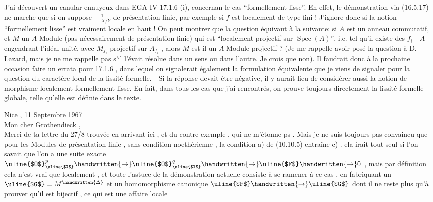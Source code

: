 
J'ai découvert un canular ennuyeux dans EGA IV 17.1.6 (i), concernan le cas ``formellement lisse''. En effet, le démonstration via (16.5.17) ne marche que si on suppose $\quad{}^1_{X/Y}$ de présentation finie, par exemple si $f$ est localement de  type fini ! J'ignore donc si la notion ``formellement lisse'' est vraiment locale en haut ! On peut montrer que la question équivaut à la suivante: si $A$ est un anneau commutatif, et $M$ un $A$-Module (pas nécessairement de présentation finie) qui est ``localement projectif sur $\operatorname{Spec}(A)$'', i.e. tel qu'il existe des $f_i\quad A$ engendrant l'idéal unité, avec $M_{f_i}$ projectif sur $A_{f_i}$ , alors $M$ est-il un $A$-Module projectif ? (Je me rappelle avoir posé la question à D. Lazard, mais je ne me rappelle pas s'il l'évait résolue dans un sens ou dans l'autre. Je crois que non). Il faudrait donc à la prochaine occasion faire un errata pour 17.1.6 , dans lequel on  signalerait également la formulation équivalente que je viens de signaler pour la question du caractère local de la lissité formelle. - Si la réponse devait être négative, il y aurait lieu de considérer aussi la notion de morphisme localement formellement lisse. En fait, dans tous les cas que j'ai rencontrés,  on prouve toujours directement la lissité formelle globale, telle qu'elle est définie dans le texte.


Nice , 11 Septembre 1967\\

Mon cher Grothendieck ,\\

Merci de ta lettre du 27/8 trouvée en arrivant ici , et du contre-exemple , qui ne m'étonne ps . Mais je ne suis toujours pas convaincu que pour les Modules de présentation finie , sans condition noethérienne , la condition a) de (10.10.5) entraîne c) . ela irait tout seul si l'on savait que l'on a une suite exacte $\text{\uline{$O$}}_{\text{\uline{$X$}}}^{p}\handwritten{\to}\text{\uline{$O$}}_{\text{\uline{$X$}}}^{q}\handwritten{\to}\text{\uline{$F$}}\handwritten{\to}0$ , mais par définition cela  n'est vrai que localement , et toute l'astuce de la démonstration actuelle consiste à se ramener à ce cas , en fabriquant un $\text{\uline{$G$}}=M^{\handwritten{\Delta}}$ et un homomorphisme canonique $\text{\uline{$F$}}\handwritten{\to}\text{\uline{$G$}}$ dont il ne reste plus qu'à prouver qu'il est bijectif , ce qui est une affaire locale

